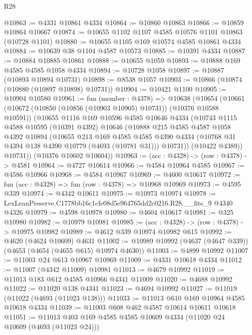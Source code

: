 \begin{lexlean}{R28}
\begin{coremodule}
@10863 := @4331 @10861 @4334
@10864 := @10860 @10863
@10866 := @10859 @10864 @10667
@10874 := @10655 @1102 @1107 @4585 @10576 @1101 @10863 (@10728 @1101)
@10880 := @10655 @1105 @169 @10574 @4585 @10861 @4334
@10884 := @10639 @38 @1104 @4587 @10573
@10885 := @10391 @4334
@10887 := @10884 @10885 @10861
@10888 := @10655 @1059
@10893 := @10888 @169 @4585 @4585 @1058 @4334
@10894 := @10728 @1058
@10897 := @10887 (@10893 @10894 @10731)
@10898 := @8538 @1057
@10903 := @10866 (@10874 (@10880 (@10897 @10898) @10731))
@10904 := @10421 @1100
@10905 := @10904 @10580
@10961 := fun (member : @4378) =>
  @10638
    (@10654
      (@10661
        (@10672 (@10850 (@10856 (@10903 @10905) @10731)) (@10376 @10588 @10591))
        (@10655
          @1116
          @169
          @10596
          @4585
          @10646
          @4334
          (@10743
            @1115
            @4588
            @10595
            (@10391 @4392)
            @10646
            (@10888
              @215
              @4585
              @4587
              @1058
              @4392
              @10894
              (@10655
                @213
                @169
                @4585
                @4585
                @4390
                @4334
                (@10768 @31 @4394 @138 @4390 @10779 (@4693 (@10781 @31)))
                @10731))
            (@10422 @4389))
          @10731))
      (@10376 @10602 @10604))
@10963 := (acc : @4328) -> (row : @4378) -> @4581
@10964 := @4727 @10614
@10966 := @4584 @10964 @4585
@10967 := @4586 @10966
@10968 := @4584 @10967
@10969 := @4600 @10617
@10972 := fun (acc : @4328) => fun (row : @4378) => @10968 @10969
@10973 := @4595 @339
@10974 := @4342 @10611
@10975 := @10973 @10974
@10978 := LexLeanPreserve.C1778bb16c1cfe08d5e964765dd2c0216.R28.__fits_9 @4340 @4326
@10979 := @4598 @10978
@10980 := @4604 @10617
@10981 := @325 @10980
@10982 := @10979 @10981
@10985 := (acc : @4328) -> (row : @4378) -> @10975 @10982
@10989 := @4612 @339 @10974 @10982 @615
@10992 := @4620 (@4624 @10609) @4631
@11002 := @10989 @10992 (@4637 (@4647 @339)) (@4653 (@4654 (@4655 @615) @10974 @4630))
@11003 := @4899 @10992
@11007 := @11003 @24 @613 @10967 @10969
@11009 := @4331 @10618 @4334
@11012 := @11007 (@4342 @11009) @10981
@11013 := @4679 @10992
@11019 := @11013 @183 @612 @4585 @10966 @4341 @11009
@11020 := @4688 @10992
@11022 := @11020 @138 @4341
@11023 := @4694 @10992
@11027 := @11019 (@11022 (@4693 (@11023 @138)))
@11033 := @11013 @610 @169 @10964 @4585 @10618 @4334
@11039 := @11003 @608 @462 @4587 @10614 @10611 @10618
@11051 := @11013 @403 @169 @4585 @4585 @10609 @4334 (@11020 @24 @10609 (@4693 (@11023 @24)))

\end{coremodule}
\end{lexlean}
